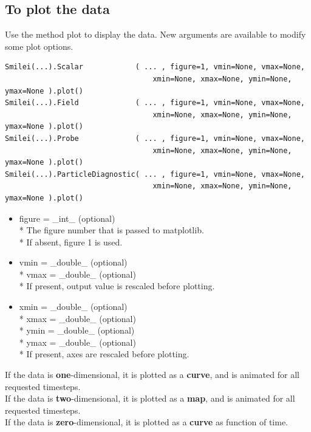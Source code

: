 \documentclass[11pt]{article}
\newcommand{\code}[1]{\colorbox{yellow!15}{\ttfamily #1}}
\begin{document}
\subsection{To plot the data}
Use the method \code{plot} to display the data. New arguments are available to modify some plot options.
\begin{lstlisting}
Smilei(...).Scalar            ( ... , figure=1, vmin=None, vmax=None,
                                  xmin=None, xmax=None, ymin=None, ymax=None ).plot()
Smilei(...).Field             ( ... , figure=1, vmin=None, vmax=None,
                                  xmin=None, xmax=None, ymin=None, ymax=None ).plot()
Smilei(...).Probe             ( ... , figure=1, vmin=None, vmax=None,
                                  xmin=None, xmax=None, ymin=None, ymax=None ).plot()
Smilei(...).ParticleDiagnostic( ... , figure=1, vmin=None, vmax=None,
                                  xmin=None, xmax=None, ymin=None, ymax=None ).plot()
\end{lstlisting}

\begin{itemize}
\item \code{figure} = \code{\_int\_}       (optional)\\*
	The figure number that is passed to matplotlib.\\*
	If absent, figure 1 is used.

\item \code{vmin} = \code{\_double\_}    (optional)\\*
	\code{vmax} = \code{\_double\_}    (optional)\\*
	If present, output value is rescaled before plotting.

\item \code{xmin} = \code{\_double\_}    (optional)\\*
	\code{xmax} = \code{\_double\_}    (optional)\\*
	\code{ymin} = \code{\_double\_}    (optional)\\*
	\code{ymax} = \code{\_double\_}    (optional)\\*
	If present, axes are rescaled before plotting.
\end{itemize}

If the data is \textbf{one}-dimensional, it is plotted as a \textbf{curve}, and is animated for all requested timesteps.\\
If the data is \textbf{two}-dimensional, it is plotted as a \textbf{map}, and is animated for all requested timesteps.\\
If the data is \textbf{zero}-dimensional, it is plotted as a \textbf{curve} as function of time.\\
\end{document}
